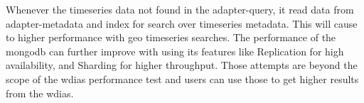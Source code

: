 Whenever the timeseries data not found in the adapter-query, it read data from adapter-metadata and index for search over timeseries metadata. This will cause to higher performance with geo timeseries searches. The performance of the \acrshort{mongodb} can further improve with using its features like Replication for high availability, and Sharding for higher throughput.
Those attempts are beyond the scope of the \acrshort{wdias} performance test and users can use those to get higher results from the \acrshort{wdias}.

